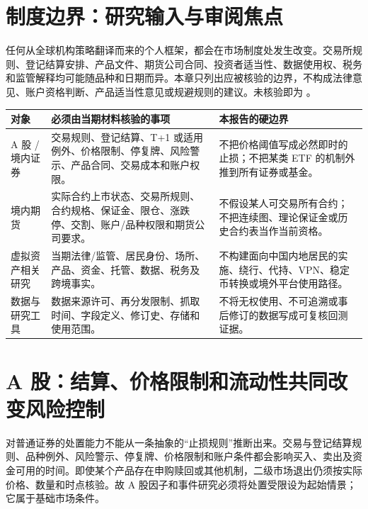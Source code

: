 \section{制度边界：研究输入与审阅焦点}

任何从全球机构策略翻译而来的个人框架，都会在市场制度处发生改变。交易所规则、登记结算安排、产品文件、期货公司合同、投资者适当性、数据使用权、税务和监管解释均可能随品种和日期而异。本章只列出应被核验的边界，不构成法律意见、账户资格判断、产品适当性意见或规避规则的建议。未核验即为 \qzero{}。

\begin{exhibitbox}
\small
\begin{tabularx}{\exhibitboxwidth}{L{2.45cm}X L{3.9cm}}
\toprule
\textbf{对象} & \textbf{必须由当期材料核验的事项} & \textbf{本报告的硬边界} \\
\midrule
A 股 / 境内证券 & 交易规则、登记结算、T+1 或适用例外、价格限制、停复牌、风险警示、产品合同、交易成本和账户权限。 & 不把价格阈值写成必然即时的止损；不把某类 ETF 的机制外推到所有证券或基金。 \\
境内期货 & 实际合约上市状态、交易所规则、合约规格、保证金、限仓、涨跌停、交割、账户/品种权限和期货公司要求。 & 不假设某人可交易所有合约；不把连续图、理论保证金或历史合约表当作当前资格。 \\
虚拟资产相关研究 & 当期法律/监管、居民身份、场所、产品、资金、托管、数据、税务及跨境事实。 & 不构建面向中国内地居民的实施、绕行、代持、VPN、稳定币转换或境外平台使用路径。 \\
数据与研究工具 & 数据来源许可、再分发限制、抓取时间、字段定义、修订史、存储和使用范围。 & 不将无权使用、不可追溯或事后修订的数据写成可复核回测证据。 \\
\bottomrule
\end{tabularx}
\end{exhibitbox}

\section{A 股：结算、价格限制和流动性共同改变风险控制}

对普通证券的处置能力不能从一条抽象的“止损规则”推断出来。交易与登记结算规则、品种例外、风险警示、停复牌、价格限制和账户条件都会影响买入、卖出及资金可用的时间。即使某个产品存在申购赎回或其他机制，二级市场退出仍须按实际价格、数量和时点核验。故 A 股因子和事件研究必须将处置受限设为起始情景；它属于基础市场条件。

